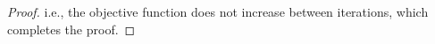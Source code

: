\documentclass[sn-mathphys-num]{sn-jnl}%
\newcommand{\rinner}[1]{\mathfrak{Re}\left(\left<#1\right>\right)}
\theoremstyle{thmstyleone}%
\theoremstyle{thmstyletwo}%
\theoremstyle{thmstylethree}%
\begin{document}
\begin{proof}
    

    i.e., the objective function does not increase between iterations, which completes the proof.
\end{proof}
\end{document}
